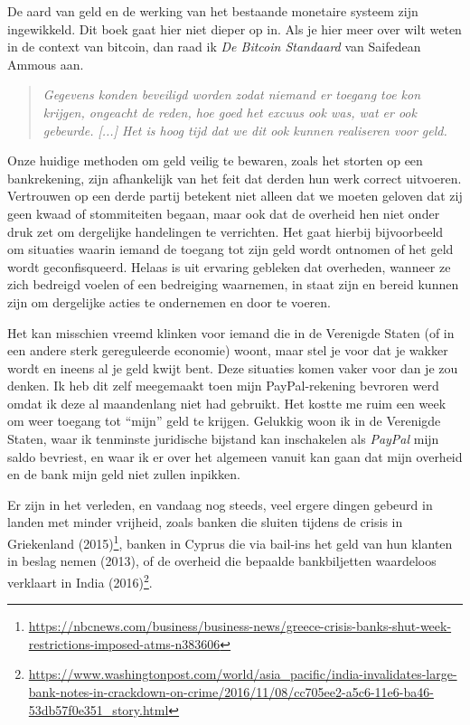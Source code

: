 De aard van geld en de werking van het bestaande monetaire systeem zijn ingewikkeld. Dit boek gaat hier niet dieper op in. Als je hier meer over wilt weten in de context van bitcoin, dan raad ik \textit{De Bitcoin Standaard} van Saifedean Ammous aan.
\clearpage
\begin{quote}
\textit{Gegevens konden beveiligd worden zodat niemand er toegang toe kon krijgen, ongeacht de reden, hoe goed het excuus ook was, wat er ook gebeurde. [...]
Het is hoog tijd dat we dit ook kunnen realiseren voor geld.} 
\end{quote}

Onze huidige methoden om geld veilig te bewaren, zoals het storten op een bankrekening, zijn afhankelijk van het feit dat derden hun werk correct uitvoeren. Vertrouwen op een derde partij betekent niet alleen dat we moeten geloven dat zij geen kwaad of stommiteiten begaan, maar ook dat de overheid hen niet onder druk zet om dergelijke handelingen te verrichten. Het gaat hierbij bijvoorbeeld om situaties waarin iemand de toegang tot zijn geld wordt ontnomen of het geld wordt geconfisqueerd. Helaas is uit ervaring gebleken dat overheden, wanneer ze zich bedreigd voelen of een bedreiging waarnemen, in staat zijn en bereid kunnen zijn om dergelijke acties te ondernemen en door te voeren.

Het kan misschien vreemd klinken voor iemand die in de Verenigde Staten (of in een andere sterk gereguleerde economie) woont, maar stel je voor dat je wakker wordt en ineens al je geld kwijt bent. Deze situaties komen vaker voor dan je zou denken. Ik heb dit zelf meegemaakt toen mijn PayPal-rekening bevroren werd omdat ik deze al maandenlang niet had gebruikt. Het kostte me ruim een week om weer toegang tot ``mijn'' geld te krijgen. Gelukkig woon ik in de Verenigde Staten, waar ik tenminste juridische bijstand kan inschakelen als \textit{PayPal} mijn saldo bevriest, en waar ik er over het algemeen vanuit kan gaan dat mijn overheid en de bank mijn geld niet zullen inpikken.

Er zijn in het verleden, en vandaag nog steeds, veel ergere dingen gebeurd in landen met minder vrijheid, zoals banken die sluiten tijdens de crisis in Griekenland (2015)\footnote{\href{https://www.nbcnews.com/business/business-news/greece-crisis-banks-shut-week-restrictions-imposed-atms-n383606}{https://nbcnews.com/business/business-news/greece-crisis-banks-shut-week-restrictions-imposed-atms-n383606}}, banken in Cyprus die via bail-ins het geld van hun klanten in beslag nemen (2013), of de overheid die bepaalde bankbiljetten waardeloos verklaart in India (2016)\footnote{\href{https://www.washingtonpost.com/world/asia\_pacific/india-invalidates-large-bank-notes-in-crackdown-on-crime/2016/11/08/cc705ee2-a5c6-11e6-ba46-53db57f0e351\_story.html}{https://www.washingtonpost.com/world/asia\_pacific/india-invalidates-large-bank-notes-in-crackdown-on-crime/2016/11/08/cc705ee2-a5c6-11e6-ba46-53db57f0e351\_story.html}}.

